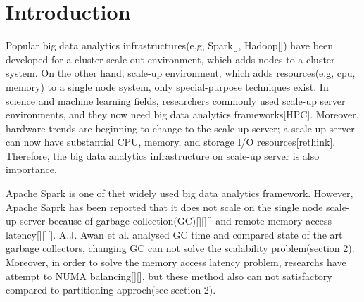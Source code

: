 \section{Introduction} \label{sec:introduction}
Popular big data analytics infrastructures(e.g, Spark[], Hadoop[]) have been
developed for a cluster scale-out environment, which adds nodes to a
cluster system.
On the other hand, scale-up environment, which adds resources(e.g, cpu, memory)
to a single node system, only special-purpose techniques exist.
In science and machine learning fields, researchers
commonly used scale-up server environments, and they now need big data analytics
frameworks[HPC].
Moreover, hardware trends are beginning to change to the scale-up
server; a scale-up server can now have substantial CPU, memory,
and storage I/O resources[rethink].
Therefore, the big data analytics infrastructure on scale-up server is
also importance.

\ifkor
Apache Spark is one of thet widely used big data analytics framework.
However, Apache Saprk has been reported that it does
not scale on the single node scale-up server because of garbage
collection(GC)[][][] and remote memory access latency[][][]. 
A.J. Awan et al. analysed GC time and compared state of the art
garbage collectors, changing GC can not solve the scalability problem(section
2).
Moreover, in order to solve the memory access latency problem, researchs have
attempt to NUMA balancing[][], but these method also can not satisfactory
compared to partitioning approch(see section 2).
\else


